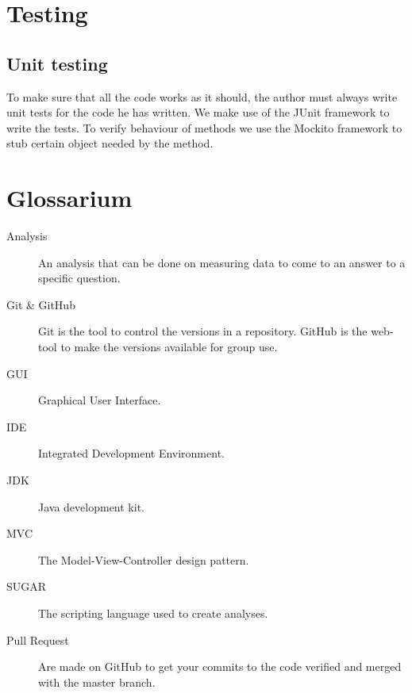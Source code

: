 \documentclass[a4paper]{article}
\begin{document}
\section{Testing}
\subsection{Unit testing}
To make sure that all the code works as it should, the author must always write
unit tests for the code he has written. We make use of the JUnit framework to
write the tests. To verify behaviour of methods we use the Mockito framework to
stub certain object needed by the method.

\section{Glossarium}

\begin{description}

\item[Analysis] An analysis that can be done on measuring data to come to an answer to a specific question.
\item[Git \& GitHub] Git is the tool to control the versions in a repository. GitHub is the web-tool to make the versions available for group use.
\item[GUI] Graphical User Interface.
\item[IDE] Integrated Development Environment.
\item[JDK] Java development kit.
\item[MVC] The Model-View-Controller design pattern.
\item[SUGAR] The scripting language used to create analyses.
\item[Pull Request] Are made on GitHub to get your commits to the code verified and merged with the master branch.

\end{description}
\end{document}
